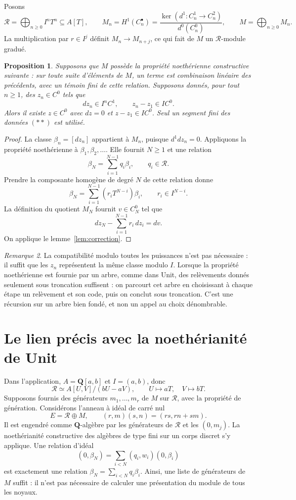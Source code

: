 \documentclass[11pt]{amsart}
\newtheorem{proposition}{Proposition}
\theoremstyle{remark}
\newtheorem{remark}[proposition]{Remarque}
\newcommand{\Rees}{\mathcal R}
\begin{document}
Posons
\[
 \Rees=\bigoplus_{n\geq0} I^nT^n\subseteq A[T],
 \qquad
 M_n=H^1(C_n^\bullet)
   =\frac{\ker(d^1:C_n^1\to C_n^2)}{d^0(C_n^0)},
 \qquad M=\bigoplus_{n\geq0}M_n.
\]
La multiplication par $r\in I^j$ définit $M_n\to M_{n+j}$,
ce qui fait de $M$ un $\Rees$-module gradué.

\begin{proposition}\label{prop:lifting}
Supposons que $M$ possède la propriété noethérienne constructive
suivante : sur toute suite d'éléments de $M$, un terme est combinaison
linéaire des précédents, avec un témoin fini de cette relation.
Supposons donnés, pour tout $n\geq1$, des $z_n\in C^0$ tels que
\[
 dz_n\in I^nC^1,\qquad z_n-z_1\in IC^0.
 \tag{**}
\]
Alors il existe $z\in C^0$ avec $dz=0$ et $z-z_1\in IC^0$.
Seul un segment fini des données $(**)$ est utilisé.
\end{proposition}
\begin{proof}
La classe $\beta_n=[dz_n]$ appartient à $M_n$, puisque $d^1dz_n=0$.
Appliquons la propriété noethérienne à $\beta_1,\beta_2,\ldots$.
Elle fournit $N\geq1$ et une relation
\[
 \beta_N=\sum_{i=1}^{N-1}q_i\beta_i,\qquad q_i\in\Rees.
\]
Prendre la composante homogène de degré $N$ de cette relation donne
\[
 \beta_N=\sum_{i=1}^{N-1}(r_iT^{N-i})\beta_i,
 \qquad r_i\in I^{N-i}.
\]
La définition du quotient $M_N$ fournit $v\in C_N^0$ tel que
\[
 dz_N-\sum_{i=1}^{N-1}r_i\,dz_i=dv.
\]
On applique le lemme~\ref{lem:correction}.
\end{proof}

\begin{remark}
La compatibilité modulo toutes les puissances n'est pas nécessaire :
il suffit que les $z_n$ représentent la même classe modulo $I$.
Lorsque la propriété noethérienne est fournie par un arbre, comme dans
Unit, des relèvements donnés seulement sous troncation suffisent : on
parcourt cet arbre en choisissant à chaque étape un relèvement et son
code, puis on conclut sous troncation. C'est une récursion sur un arbre
bien fondé, et non un appel au choix dénombrable.
\end{remark}

\section{Le lien précis avec la noethérianité de Unit}

Dans l'application, $A=\mathbf Q[a,b]$ et $I=(a,b)$, donc
\[
 \Rees\simeq A[U,V]/(bU-aV),\qquad U\mapsto aT,\quad V\mapsto bT.
\]
Supposons fournis des générateurs $m_1,\ldots,m_r$ de $M$ sur
$\Rees$, avec la propriété de génération. Considérons l'anneau
à idéal de carré nul
\[
 E=\Rees\oplus M,\qquad
 (r,m)(s,n)=(rs,rn+sm).
\]
Il est engendré comme $\mathbf Q$-algèbre par les générateurs de
$\Rees$ et les $(0,m_j)$. La noethérianité constructive des algèbres
de type fini sur un corps discret s'y applique.
Une relation d'idéal
\[
 (0,\beta_N)=\sum_{i<N}(q_i,w_i)(0,\beta_i)
\]
est exactement une relation $\beta_N=\sum_{i<N}q_i\beta_i$.
Ainsi, une liste de générateurs de $M$ suffit : il n'est pas nécessaire
de calculer une présentation du module de tous les noyaux.
\end{document}
